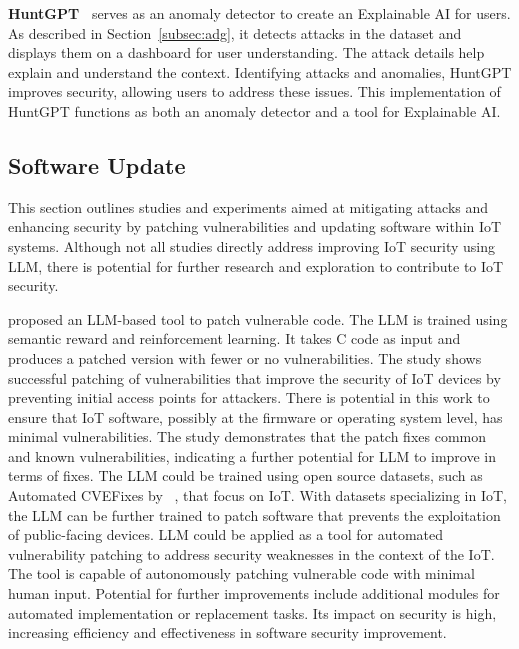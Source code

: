 \smallskip
\noindent \textbf{HuntGPT~\citet{ali2023huntgpt}} serves as an anomaly detector to create an Explainable AI for users.
As described in Section~\ref{subsec:adg}, it detects attacks in the dataset and displays them on a dashboard for user understanding.
The attack details help explain and understand the context.
Identifying attacks and anomalies, HuntGPT improves security, allowing users to address these issues.
This implementation of HuntGPT functions as both an anomaly detector and a tool for Explainable AI.
%
\subsection{Software Update}
%
This section outlines studies and experiments aimed at mitigating attacks and enhancing security by patching vulnerabilities and updating software within IoT systems.
Although not all studies directly address improving IoT security using LLM, there is potential for further research and exploration to contribute to IoT security.

\smallskip
\noindent \textbf{\citet{islam2024llmpowered}} proposed an LLM-based tool to patch vulnerable code.
The LLM is trained using semantic reward and reinforcement learning.
It takes C code as input and produces a patched version with fewer or no vulnerabilities.
The study shows successful patching of vulnerabilities that improve the security of IoT devices by preventing initial access points for attackers.
There is potential in this work to ensure that IoT software, possibly at the firmware or operating system level, has minimal vulnerabilities.
The study demonstrates that the patch fixes common and known vulnerabilities, indicating a further potential for LLM to improve in terms of fixes.
The LLM could be trained using open source datasets, such as Automated CVEFixes by ~\citet{bhandari2021:cvefixes}, that focus on IoT.
With datasets specializing in IoT, the LLM can be further trained to patch software that prevents the exploitation of public-facing devices.
LLM could be applied as a tool for automated vulnerability patching to address security weaknesses in the context of the IoT.
The tool is capable of autonomously patching vulnerable code with minimal human input.
Potential for further improvements include additional modules for automated implementation or replacement tasks.
Its impact on security is high, increasing efficiency and effectiveness in software security improvement.

